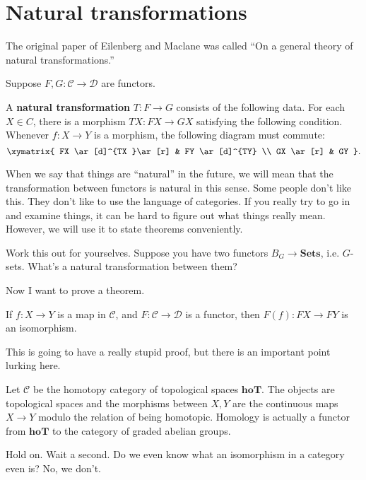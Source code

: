 \section{Natural transformations}

The original paper of Eilenberg and Maclane was called ``On a general theory of
natural transformations.''


Suppose $F, G: \mathcal{C} \to \mathcal{D}$ are functors.

\begin{definition} 
A \textbf{natural transformation} $T: F \to G$ consists of the following data.
For each $X \in C$, there is a morphism $TX: FX \to GX$ satisfying the following
condition. Whenever $f: X \to Y$ is a morphism, the following diagram must
commute:
\[ \xymatrix{
FX \ar[d]^{TX }\ar[r] &  FY \ar[d]^{TY}  \\
GX \ar[r] &  GY
}.\]
\end{definition} 

When we say that things are ``natural'' in the future, we will mean that the
transformation between functors is natural in this sense. 
Some people don't like this. They don't like to use the language of categories.
If you really try to go in and examine things, it can be hard to figure out
what things really mean.
However, we will use it to state theorems conveniently. 


\begin{exercise} 
Work this out for yourselves. Suppose you have two functors $B_G \to
\mathbf{Sets}$, i.e. $G$-sets. What's a natural transformation between them?
\end{exercise} 

Now I want to prove a theorem.
\begin{theorem} 
If $f: X \to Y$ is a map in $\mathcal{C}$, and $F: \mathcal{C} \to \mathcal{D}$
is a functor, then $F(f): FX \to FY$ is an isomorphism. 
\end{theorem} 
This is going to have a really stupid proof, but there is an important point
lurking here.
\begin{example} 
Let $\mathcal{C}$ be the homotopy category of topological spaces
$\mathbf{hoT}$. The objects are topological spaces and the morphisms between
$X, Y$ are the continuous maps $X \to Y$ modulo the relation of being
homotopic. Homology is actually a functor from $\mathbf{hoT}$ to the category
of graded abelian groups.
\end{example} 


Hold on. Wait a second. Do we even know what an isomorphism in a category even
is? No, we don't.

